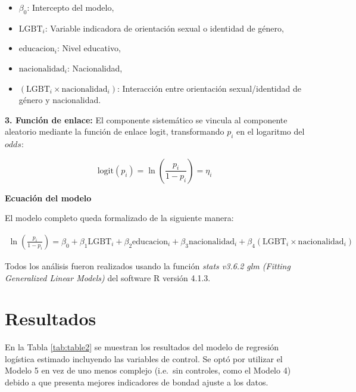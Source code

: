 \documentclass[
  12pt,
  a4paper,
]{article}
\providecommand{\tightlist}{%
  \setlength{\itemsep}{0pt}\setlength{\parskip}{0pt}}
\begin{document}
\begin{itemize}
\tightlist
\item
  \(\beta_0\): Intercepto del modelo,\\
\item
  \(\text{LGBT}_i\): Variable indicadora de orientación sexual o identidad de género,\\
\item
  \(\text{educacion}_i\): Nivel educativo,\\
\item
  \(\text{nacionalidad}_i\): Nacionalidad,\\
\item
  \((\text{LGBT}_i \times \text{nacionalidad}_i)\): Interacción entre orientación sexual/identidad de género y nacionalidad.
\end{itemize}

\textbf{3. Función de enlace:} El componente sistemático se vincula al componente aleatorio mediante la función de enlace logit, transformando \(p_i\) en el logaritmo del \(odds\):

\[
\text{logit}(p_i) = \ln\left(\frac{p_i}{1-p_i}\right) = \eta_i
\]

\textbf{Ecuación del modelo}

El modelo completo queda formalizado de la siguiente manera:

\[
\begin{aligned}
\ln\left(\frac{p_i}{1-p_i}\right) = \beta_0 + \beta_1 \text{LGBT}_i + \beta_2 \text{educacion}_i+ \beta_3 \text{nacionalidad}_i + \beta_4 (\text{LGBT}_i \times \text{nacionalidad}_i)
\end{aligned}
\]

Todos los análisis fueron realizados usando la función \emph{stats v3.6.2 glm (Fitting Generalized Linear Models)} del software R versión 4.1.3.

\hypertarget{resultados}{%
\section{Resultados}\label{resultados}}

En la Tabla \ref{tab:table2} se muestran los resultados del modelo de regresión logística estimado incluyendo las variables de control. Se optó por utilizar el Modelo 5 en vez de uno menos complejo (i.e.~sin controles, como el Modelo 4) debido a que presenta mejores indicadores de bondad ajuste a los datos.
\end{document}
